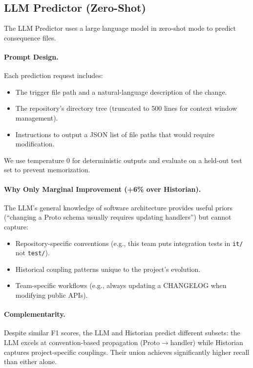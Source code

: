 \documentclass[sigconf,nonacm]{acmart}
\begin{document}
\subsection{LLM Predictor (Zero-Shot)}

The LLM Predictor uses a large language model in zero-shot mode to predict consequence files.

\paragraph{Prompt Design.} Each prediction request includes:
\begin{itemize}
    \item The trigger file path and a natural-language description of the change.
    \item The repository's directory tree (truncated to 500 lines for context window management).
    \item Instructions to output a JSON list of file paths that would require modification.
\end{itemize}

We use temperature 0 for deterministic outputs and evaluate on a held-out test set to prevent memorization.

\paragraph{Why Only Marginal Improvement (+6\% over Historian).} The LLM's general knowledge of software architecture provides useful priors (``changing a Proto schema usually requires updating handlers'') but cannot capture:
\begin{itemize}
    \item Repository-specific conventions (e.g., this team puts integration tests in \texttt{it/} not \texttt{test/}).
    \item Historical coupling patterns unique to the project's evolution.
    \item Team-specific workflows (e.g., always updating a CHANGELOG when modifying public APIs).
\end{itemize}

\paragraph{Complementarity.} Despite similar F1 scores, the LLM and Historian predict different subsets: the LLM excels at convention-based propagation (Proto$\to$handler) while Historian captures project-specific couplings. Their union achieves significantly higher recall than either alone.
\end{document}
